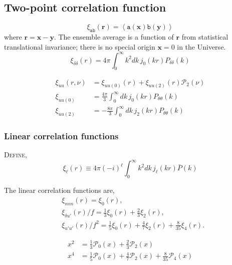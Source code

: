\documentclass[a4paper,11pt, fleqn]{article}
\begin{document}
\clearpage
\subsection{Two-point correlation function}

\begin{equation}
  \xi_{\mathtt{ab}}(\bm{r}) = \left\langle \mathtt{a}(\bm{x}) \mathtt{b}(\bm{y})
                             \right\rangle
\end{equation}
%
where $\bm{r} = \bm{x} - \bm{y}$. The ensemble average is a function
of $\bm{r}$ from statistical translational invariance; there is no
special origin $\bm{x} = 0$ in the Universe.\\

\begin{equation}
  \xi_{\delta\delta}(r) = 4\pi \int_0^\infty \! k^2 dk\,
  j_0(kr) P_{\delta\delta}(k)
\end{equation}

\begin{align}
  \xi_{uu}(r, \nu) &= \xi_{uu(0)}(r) + \xi_{uu(2)}(r) \mathcal{P}_2(\nu)\\
  \xi_{uu(0)} &= \frac{4\pi}{3} \int_0^\infty \!dk\,
                   j_0(kr) P_{\theta\theta}(k)\\
  \xi_{uu(2)} &= -\frac{8\pi}{3} \int_0^\infty \! dk\,
                   j_2(kr) P_{\theta\theta}(k)
\end{align}

\clearpage
\subsubsection{Linear correlation functions}
\textsc{Define},
%
\begin{equation}
  \xi_{\ell}(r)
  \equiv 4\pi (-i)^\ell \int_0^\infty \! k^2 dk \, j_\ell(kr) \bar{P}(k)
\end{equation}


The linear correlation functions are,
\begin{align}
  &\xi_{mm}(r) = \xi_0(r),\\
  &\xi_{\delta u'}(r)/f = \frac{1}{3} \xi_0(r) + \frac{2}{3} \xi_2(r),\\
  &\xi_{u'u'}(r)/f^2 = \frac{1}{5} \xi_0(r) + \frac{4}{7} \xi_2(r)
                      +\frac{8}{35} \xi_4(r).
\end{align}

\begin{align}
  x^2 &= \frac{1}{3} \mathcal{P}_0(x) + \frac{2}{3} \mathcal{P}_2(x)\\
  x^4 &= \frac{1}{5}\mathcal{P}_0(x)
  + \frac{4}{7} \mathcal{P}_2(x)
  + \frac{8}{35} \mathcal{P}_4(x)
\end{align}
  
\end{document}
